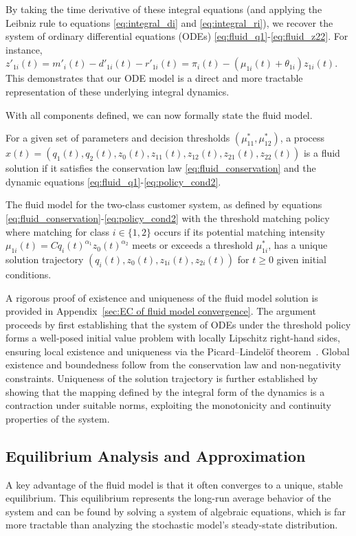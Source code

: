 By taking the time derivative of these integral equations (and applying the Leibniz rule to equations \eqref{eq:integral_di} and \eqref{eq:integral_ri}), we recover the system of ordinary differential equations (ODEs) \eqref{eq:fluid_q1}-\eqref{eq:fluid_z22}.
For instance, $z'_{1i}(t) = m'_i(t) - d'_{1i}(t) - r'_{1i}(t) = \pi_i(t) - (\mu_{1i}(t)+\theta_{1i})z_{1i}(t)$.
This demonstrates that our ODE model is a direct and more tractable representation of these underlying integral dynamics.

With all components defined, we can now formally state the fluid model.
\begin{definition}
For a given set of parameters and decision thresholds $(\mu_{11}^*, \mu_{12}^*)$, a process $x(t) = (q_1(t), q_2(t), z_0(t), z_{11}(t), z_{12}(t), z_{21}(t), z_{22}(t))$ is a fluid solution if it satisfies the conservation law \eqref{eq:fluid_conservation} and the dynamic equations \eqref{eq:fluid_q1}-\eqref{eq:policy_cond2}.
\end{definition}

\begin{proposition} \label{prop:fluid_model_existence_uniqueness}
The fluid model for the two-class customer system, as defined by equations \eqref{eq:fluid_conservation}-\eqref{eq:policy_cond2} with the threshold matching policy where matching for class $i \in \{1,2\}$ occurs if its potential matching intensity $\mu_{1i}(t) = C q_i(t)^{\alpha_1} z_0(t)^{\alpha_2}$ meets or exceeds a threshold $\mu_{1i}^*$, has a unique solution trajectory $(q_i(t), z_0(t), z_{1i}(t), z_{2i}(t))$ for $t \ge 0$ given initial conditions.
\end{proposition}
A rigorous proof of existence and uniqueness of the fluid model solution is provided in Appendix~\ref{sec:EC of fluid model convergence}.
The argument proceeds by first establishing that the system of ODEs under the threshold policy forms a well-posed initial value problem with locally Lipschitz right-hand sides, ensuring local existence and uniqueness via the Picard–Lindelöf theorem~\citep{coddington1955theory}.
Global existence and boundedness follow from the conservation law and non-negativity constraints.
Uniqueness of the solution trajectory is further established by showing that the mapping defined by the integral form of the dynamics is a contraction under suitable norms, exploiting the monotonicity and continuity properties of the system.

\subsection{Equilibrium Analysis and Approximation}
\label{sec:fluid_model_equilibrium}
A key advantage of the fluid model is that it often converges to a unique, stable equilibrium.
This equilibrium represents the long-run average behavior of the system and can be found by solving a system of algebraic equations, which is far more tractable than analyzing the stochastic model's steady-state distribution.

